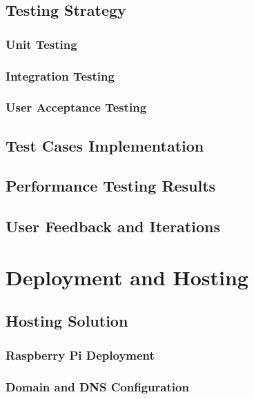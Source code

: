 \documentclass[12pt,a4paper]{report}
\begin{document}
\section{Testing Strategy}
\subsection{Unit Testing}

\subsection{Integration Testing}

\subsection{User Acceptance Testing}

\section{Test Cases Implementation}

\section{Performance Testing Results}

\section{User Feedback and Iterations}

\chapter{Deployment and Hosting}
\section{Hosting Solution}
\subsection{Raspberry Pi Deployment}

\subsection{Domain and DNS Configuration}
\end{document}
